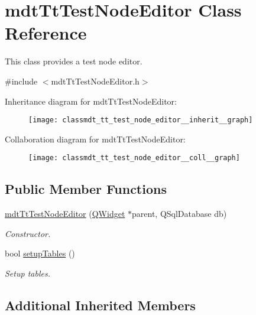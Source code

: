 \hypertarget{classmdt_tt_test_node_editor}{\section{mdt\-Tt\-Test\-Node\-Editor Class Reference}
\label{classmdt_tt_test_node_editor}
}


This class provides a test node editor.  




{\ttfamily \#include $<$mdt\-Tt\-Test\-Node\-Editor.\-h$>$}



Inheritance diagram for mdt\-Tt\-Test\-Node\-Editor\-:\nopagebreak
\begin{figure}[H]
\begin{center}
\leavevmode
\texttt{[image: classmdt\_tt\_test\_node\_editor\_\_inherit\_\_graph]}
\end{center}
\end{figure}


Collaboration diagram for mdt\-Tt\-Test\-Node\-Editor\-:\nopagebreak
\begin{figure}[H]
\begin{center}
\leavevmode
\texttt{[image: classmdt\_tt\_test\_node\_editor\_\_coll\_\_graph]}
\end{center}
\end{figure}
\subsection*{Public Member Functions}
\begin{DoxyCompactItemize}
\item 
\hyperlink{classmdt_tt_test_node_editor_ad386179f526dbeefda020d4c209d14a7}{mdt\-Tt\-Test\-Node\-Editor} (\hyperlink{class_q_widget}{Q\-Widget} $\ast$parent, Q\-Sql\-Database db)
\begin{DoxyCompactList}\small\item\em Constructor. \end{DoxyCompactList}\item 
bool \hyperlink{classmdt_tt_test_node_editor_ac8f144b6fb17a2dd6eec9eae7a824b6b}{setup\-Tables} ()
\begin{DoxyCompactList}\small\item\em Setup tables. \end{DoxyCompactList}\end{DoxyCompactItemize}
\subsection*{Additional Inherited Members}


